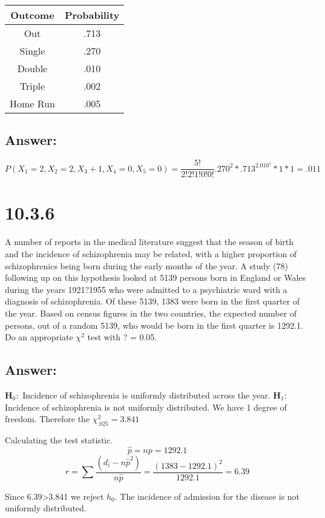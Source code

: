 \documentclass[svgnames]{article}
\begin{document}
\begin{table}[h!]
\centering
 \begin{tabular}{c c } 
 \hline
Outcome & Probability\\
 \hline
Out & .713\\
Single & .270\\
Double & .010\\
Triple & .002\\
Home Run & .005\\
 \hline
 \end{tabular}
\end{table}

\subsection*{Answer:}
$$P(X_1=2,X_2=2,X_3+1,X_4=0,X_5=0)=\frac{5!}{2!2!1!0!0!}.270^2*.713^2.010^1*1*1=.011$$

\section{10.3.6}
A number of reports in the medical literature suggest that the season of birth and the incidence of schizophrenia may be related, with a higher proportion of schizophrenics being born during the early months of the year. A study (78) following up on this hypothesis looked at 5139 persons born in England or Wales during the years 1921?1955 who were admitted to a psychiatric ward with a diagnosis of schizophrenia. Of these 5139, 1383 were born in the first quarter of the year. Based on census figures in the two countries, the expected number of persons, out of a random 5139, who would be born in the first quarter is 1292.1. Do an appropriate $\chi^2$ test with ? = 0.05.

\subsection*{Answer:}
\textbf{H$_0:$} Incidence of schizophrenia is uniformly distributed across the year.
\newline
\textbf{H$_1:$} Incidence of schizophrenia is not uniformly distributed.
\newline
We have 1 degree of freedom. 
Therefore the $\chi^2_{.025} = 3.841$

Calculating the test statistic.
$$\hat{p}=np=1292.1$$
$$r=\sum\frac{(d_i-n\hat{p}^2)}{n\hat{p}}=\frac{(1383-1292.1)^2}{1292.1}=6.39$$

Since 6.39>3.841 we reject $h_0$. The incidence of admission for the disease is not uniformly distributed.
\end{document}
